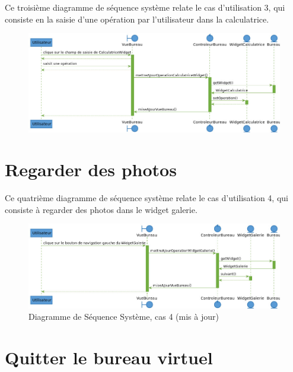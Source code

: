 \section{\color{red}{Saisir une opération (supprimé)}}

\color{red}{}Ce troisième diagramme de séquence système relate le cas d'utilisation
3, qui consiste en la saisie d'une opération par l'utilisateur dans la 
calculatrice.\color{black}

\begin{figure}[h!]
	\centering
	\includegraphics[scale=0.4]{diagrammes/dss3.jpg}
	\caption{\color{red}{Diagramme de Séquence Système, cas 3 (supprimé)}}
\end{figure}

\section{Regarder des photos}

Ce quatrième diagramme de séquence système relate le cas d'utilisation
4, qui consiste à regarder des photos dans le widget galerie.

\begin{figure}[h!]
	\centering
	\includegraphics[scale=0.48]{diagrammes/dss4.jpg}
	\caption{\color{ForestGreen}Diagramme de Séquence Système, cas 4 (mis à jour)\color{black}}
\end{figure}
\newpage

\section{Quitter le bureau virtuel}

